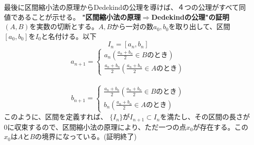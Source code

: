 \documentclass[10pt]{jarticle}
\begin{document}
最後に区間縮小法の原理からDedekindの公理を導けば、４つの公理がすべて同値であることが示せる。
\textbf{"区間縮小法の原理$\Longrightarrow$Dedekindの公理"の証明}\\
$(A,B)$を実数の切断とする。$A,B$から一対の数$a_0,b_0$を取り出して、区間$[a_0,b_0]$を$I_0$と名付ける。以下
\[I_n=[a_n,b_n]\]
\[
  a_{n+1}=\begin{cases}
    a_n　(\frac{a_n+b_n}{2}\in Bのとき)\\
    \frac{a_n+b_n}{2}(\frac{a_n+b_n}{2}\in Aのとき)
  \end{cases}
\]\\
\[
  b_{n+1}=\begin{cases}
     \frac{a_n+b_n}{2}(\frac{a_n+b_n}{2}\in Bのとき)\\
    b_n(\frac{a_n+b_n}{2}\in Aのとき)
  \end{cases}
\]
このように、区間を定義すれば、
$\{I_n\}$が$I_{n+1}\subset I_n$を満たし、その区間の長さが$0$に収束するので、区間縮小法の原理により、ただ一つの点$x_0$が存在する。この$x_0$は$A$と$B$の境界になっている。(証明終了)
\end{document}
